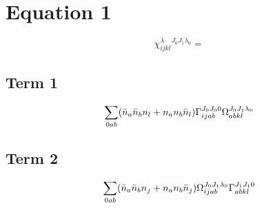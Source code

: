 \documentclass{scrartcl}
\begin{document}
\section{Equation 1}
\begin{dmath*}
\chi^{\lambda}_{i j k l}^{{J}_{0} {J}_{1} {{\lambda}}_{0}} = 
\end{dmath*}
\subsection{Term 1}
\begin{dmath*}
\sum_{0 a b} \* (\bar{n}_{a} \* \bar{n}_{b} \* n_{l} + n_{a} \* n_{b} \* \bar{n}_{l}) \* \Gamma_{i j a b}^{{J}_{0} {J}_{0} 0} \* \Omega_{a b k l}^{{J}_{0} {J}_{1} {{\lambda}}_{0}}
\end{dmath*}
\subsection{Term 2}
\begin{dmath*}
\sum_{0 a b} \* (\bar{n}_{a} \* \bar{n}_{b} \* n_{j} + n_{a} \* n_{b} \* \bar{n}_{j}) \* \Omega_{i j a b}^{{J}_{0} {J}_{1} {{\lambda}}_{0}} \* \Gamma_{a b k l}^{{J}_{1} {J}_{1} 0}
\end{dmath*}
\end{document}
